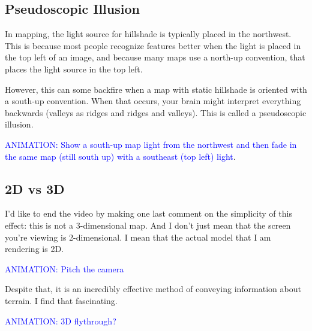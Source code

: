 \documentclass{article}
\newcommand\animation[1]{\textcolor{blue}{ANIMATION: #1}}
\begin{document}
\subsection{Pseudoscopic Illusion}

In mapping, the light source for hillshade is typically placed in the northwest.
This is because most people recognize features better when the light is placed in the top left of an image, and because many maps use a north-up convention, that places the light source in the top left.

However, this can some backfire when a map with static hillshade is oriented with a south-up convention.
When that occurs, your brain might interpret everything backwards (valleys as ridges and ridges and valleys).
This is called a pseudoscopic illusion.

\animation{Show a south-up map light from the northwest and then fade in the same map (still south up) with a southeast (top left) light}.

\subsection{2D vs 3D}

I'd like to end the video by making one last comment on the simplicity of this effect: this is not a 3-dimensional map.
And I don't just mean that the screen you're viewing is 2-dimensional.
I mean that the actual model that I am rendering is 2D.

\animation{Pitch the camera}

Despite that, it is an incredibly effective method of conveying information about terrain.
I find that fascinating.

\animation{3D flythrough?}
\end{document}
